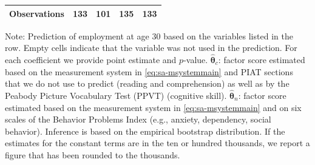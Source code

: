 \documentclass[static]{JJH-Beamer}
\begin{document}
\begin{frame}
\begin{table}[H]
\begin{center}
{\begin{tabular}{lcccccccc}
Observations &   \multicolumn{2}{c}{133} &            \multicolumn{2}{c}{101} &          \multicolumn{2}{c}{135} &            \multicolumn{2}{c}{133}           \\
\bottomrule
\end{tabular}
}
\end{center}
\tiny \flushleft
Note: Prediction of employment at age 30 based on the variables listed in the row. Empty cells indicate that the variable was not used in the prediction. For each coefficient we provide point estimate and $p$-value. $\hat{\bm{\theta}}_{c}$: factor score estimated based on the measurement system in \eqref{eq:sa-msystemmain} and PIAT sections that we do not use to predict (reading and comprehension) as well as by the Peabody Picture Vocabulary Test (PPVT) (cognitive skill). $\hat{\bm{\theta}}_{n}$: factor score estimated based on the measurement system in \eqref{eq:sa-msystemmain} and on six scales of the Behavior Problems Index (e.g., anxiety, dependency, social behavior). Inference is based on the empirical bootstrap distribution. If the estimates for the constant terms are in the ten or hundred thousands, we report a figure that has been rounded to the thousands.\\
\end{table}

\end{frame}
\end{document}
